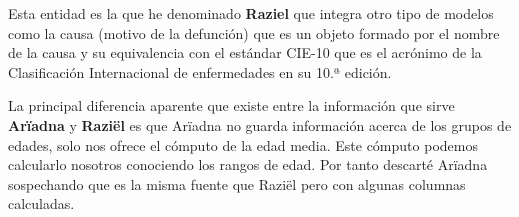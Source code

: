 Esta entidad es la que he denominado \textbf{Raziel} que integra otro tipo de modelos como la causa (motivo de la defunción) que es un objeto formado por el nombre de la causa y su equivalencia con el estándar \gls{CIE-10} que es el acrónimo de la Clasificación Internacional de enfermedades en su 10.ª edición.

La principal diferencia aparente que existe entre la información que sirve \textbf{Arïadna} y \textbf{Raziël} es que Arïadna no guarda información acerca de los grupos de edades, solo nos ofrece el cómputo de la edad media. Este cómputo podemos calcularlo nosotros conociendo los rangos de edad. Por tanto descarté Arïadna sospechando que es la misma fuente que Raziël pero con algunas columnas calculadas.